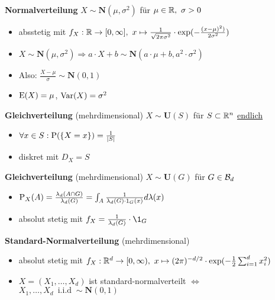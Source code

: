 \textbf{Normalverteilung} $X\sim\mathbf{N}(\mu,\sigma^2)$ für 
$\mu\in\R,\ \sigma>0$
\begin{itemize}
\item absstetig mit $f_X:\R\to[0,\infty],\ 
x\mapsto\frac{1}{\sqrt{2\pi\sigma^2}}\cdot\exp(-\frac{(x-\mu)^2)}{2\sigma^2})$

\item $X\sim\mathbf{N}(\mu,\sigma^2)
\Rightarrow a\cdot X+b\sim\mathbf{N}(a\cdot\mu+b,a^2\cdot\sigma^2)$

\item Also: $\frac{X-\mu}{\sigma}\sim\mathbf{N}(0,1)$

\item $\E(X)=\mu$, $\Var(X)=\sigma^2$
\end{itemize}

\textbf{Gleichverteilung} (mehrdimensional) $X\sim\mathbf{U}(S)$ für $S\subset\R^n$
\underline{endlich}
\begin{itemize}
\item $\forall x\in S: \P(\{X=x\})=\frac{1}{|S|}$

\item diskret mit $D_X=S$
\end{itemize}

\textbf{Gleichverteilung} (mehrdimensional) $X\sim\mathbf{U}(G)$ für $G\in\B{d}$
\begin{itemize}
\item $\P_X(A)=\frac{\lambda_d(A\cap G)}{\lambda_d(G)}=
\int_A \frac{1}{\lambda_d(G)\cdot 1_G(x)}d\lambda(x)$

\item absolut stetig mit $f_X=\frac{1}{\lambda_d(G)}\cdot \1_G$
\end{itemize}

\textbf{Standard-Normalverteilung} (mehrdimensional)
\begin{itemize}
\item absolut stetig mit 
$f_X:\R^d\to [0,\infty),\ 
x\mapsto(2\pi)^{-d/2}\cdot\exp(-\frac{1}{2}\sum_{i=1}^{d}x_i^2)$

\item $X=(X_1,\ldots,X_d)$ ist standard-normalverteilt 
$\Leftrightarrow$ $X_1,\ldots,X_d\ \operatorname{i.i.d}\sim\mathbf{N}(0,1)$
\end{itemize}
